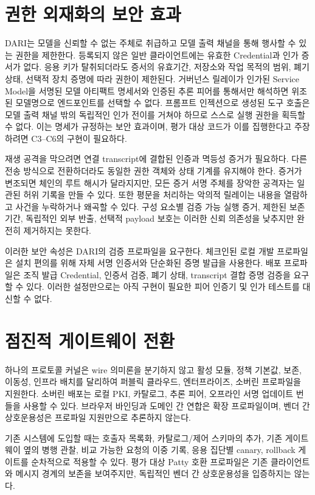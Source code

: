 \documentclass[10pt]{article}
\begin{document}
\section{권한 외재화의 보안 효과}

DARI는 모델을 신뢰할 수 없는 주체로 취급하고 모델 출력 채널을 통해 행사할 수 있는 권한을 제한한다. 등록되지 않은 일반 클라이언트에는 유효한 Credential과 인가 증서가 없다. 응용 키가 탈취되더라도 증서의 유효기간, 저장소와 작업 목적의 범위, 폐기 상태, 선택적 장치 증명에 따라 권한이 제한된다. 거버넌스 릴레이가 인가된 Service Model을 서명된 모델 아티팩트 명세서와 인증된 추론 피어를 통해서만 해석하면 위조된 모델명으로 엔드포인트를 선택할 수 없다. 프롬프트 인젝션으로 생성된 도구 호출은 모델 출력 채널 밖의 독립적인 인가 전이를 거쳐야 하므로 스스로 실행 권한을 획득할 수 없다. 이는 명세가 규정하는 보안 효과이며, 평가 대상 코드가 이를 집행한다고 주장하려면 C3--C6의 구현이 필요하다.

재생 공격을 막으려면 연결 transcript에 결합된 인증과 멱등성 증거가 필요하다. 다른 전송 방식으로 전환하더라도 동일한 권한 객체와 상태 기계를 유지해야 한다. 증거가 변조되면 체인의 루트 해시가 달라지지만, 모든 증거 서명 주체를 장악한 공격자는 일관된 허위 기록을 만들 수 있다. 또한 평문을 처리하는 악의적 릴레이는 내용을 열람하고 사건을 누락하거나 왜곡할 수 있다. 구성 요소별 검증 가능 실행 증거, 제한된 보존 기간, 독립적인 외부 반출, 선택적 payload 보호는 이러한 신뢰 의존성을 낮추지만 완전히 제거하지는 못한다.

이러한 보안 속성은 DARI의 검증 프로파일을 요구한다. 체크인된 로컬 개발 프로파일은 설치 편의를 위해 자체 서명 인증서와 단순화된 증명 발급을 사용한다. 배포 프로파일은 조직 발급 Credential, 인증서 검증, 폐기 상태, transcript 결합 증명 검증을 요구할 수 있다. 이러한 설정만으로는 아직 구현이 필요한 피어 인증기 및 인가 테스트를 대신할 수 없다.

\section{점진적 게이트웨이 전환}

하나의 프로토콜 커널은 wire 의미론을 분기하지 않고 활성 모듈, 정책 기본값, 보존, 이동성, 인프라 배치를 달리하여 퍼블릭 클라우드, 엔터프라이즈, 소버린 프로파일을 지원한다. 소버린 배포는 로컬 PKI, 카탈로그, 추론 피어, 오프라인 서명 업데이트 번들을 사용할 수 있다. 브라우저 바인딩과 도메인 간 연합은 확장 프로파일이며, 벤더 간 상호운용성은 프로파일 지원만으로 추론하지 않는다.

기존 시스템에 도입할 때는 호출자 목록화, 카탈로그/제어 스키마의 추가, 기존 게이트웨이 옆의 병행 관찰, 비교 가능한 요청의 이중 기록, 응용 집단별 canary, rollback 게이트를 순차적으로 적용할 수 있다. 평가 대상 Patty 호환 프로파일은 기존 클라이언트와 메시지 경계의 보존을 보여주지만, 독립적인 벤더 간 상호운용성을 입증하지는 않는다.
\end{document}
